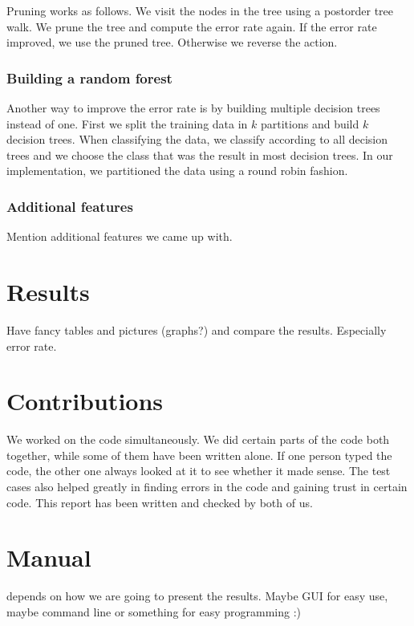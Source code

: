 \documentclass[10pt,a4paper]{article}
\begin{document}
Pruning works as follows. We visit the nodes in the tree using a postorder tree walk. We prune the tree and compute the error rate again. If the error rate improved, we use the pruned tree. Otherwise we reverse the action.
\subsubsection{Building a random forest}
Another way to improve the error rate is by building multiple decision trees instead of one. First we split the training data in $k$ partitions and build $k$ decision trees. When classifying the data, we classify according to all decision trees and we choose the class that was the result in most decision trees. In our implementation, we partitioned the data using a round robin fashion.

\subsubsection{Additional features}
Mention additional features we came up with.

\section{Results}
Have fancy tables and pictures (graphs?) and compare the results. Especially error rate. 

\section{Contributions}
We worked on the code simultaneously. We did certain parts of the code both together, while some of them have been written alone. If one person typed the code, the other one always looked at it to see whether it made sense. The test cases also helped greatly in finding errors in the code and gaining trust in certain code. This report has been written and checked by both of us.

\section{Manual}
depends on how we are going to present the results. Maybe GUI for easy use, maybe command line or something for easy programming :)
\end{document}
